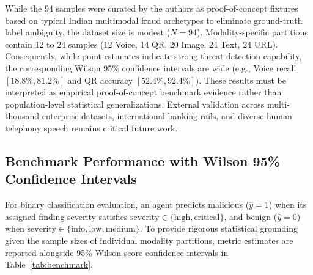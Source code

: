 \documentclass[conference]{IEEEtran}
\begin{document}
\begin{table}[htbp]
\caption{Benchmark Dataset Partition and Threat Archetypes}
\label{tab:dataset}
\centering
{}
\end{table}

While the 94 samples were curated by the authors as proof-of-concept fixtures based on typical Indian multimodal fraud archetypes to eliminate ground-truth label ambiguity, the dataset size is modest ($N=94$). Modality-specific partitions contain 12 to 24 samples (12 Voice, 14 QR, 20 Image, 24 Text, 24 URL). Consequently, while point estimates indicate strong threat detection capability, the corresponding Wilson 95\% confidence intervals are wide (e.g., Voice recall $[18.8\%, 81.2\%]$ and QR accuracy $[52.4\%, 92.4\%]$). These results must be interpreted as empirical proof-of-concept benchmark evidence rather than population-level statistical generalizations. External validation across multi-thousand enterprise datasets, international banking rails, and diverse human telephony speech remains critical future work.

\subsection{Benchmark Performance with Wilson 95\% Confidence Intervals}
For binary classification evaluation, an agent predicts malicious ($\hat{y} = 1$) when its assigned finding severity satisfies $\text{severity} \in \{\text{high}, \text{critical}\}$, and benign ($\hat{y} = 0$) when $\text{severity} \in \{\text{info}, \text{low}, \text{medium}\}$. To provide rigorous statistical grounding given the sample sizes of individual modality partitions, metric estimates are reported alongside 95\% Wilson score confidence intervals \cite{wilson1927score} in Table~\ref{tab:benchmark}.
\end{document}
